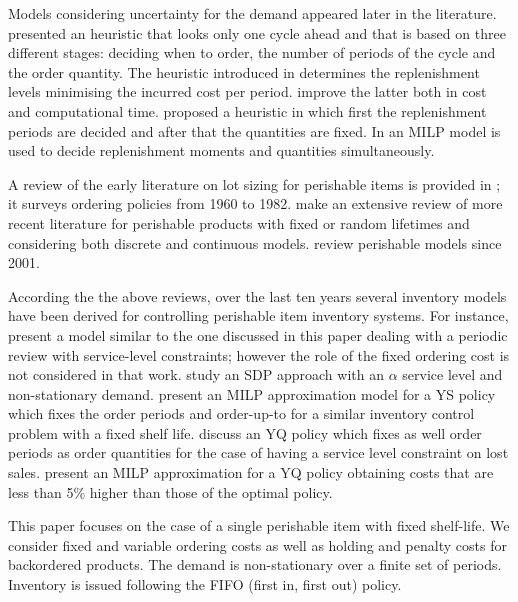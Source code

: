 \documentclass{tPRS2e}
\begin{document}
	Models considering uncertainty for the demand appeared later in the literature. \cite{citeulike:7292564} presented an heuristic that looks only one cycle ahead and that is based on three different stages: deciding when to order, the number of periods of the cycle and the order quantity. The heuristic introduced in \cite{Askin} determines the replenishment levels minimising the incurred cost per period. \cite{Bollapragada:1999} improve the latter both in cost and computational time.  \cite{BookbinderandTan} proposed a heuristic in which first the replenishment periods are decided and after that the quantities are fixed. In \cite{citeulike:12317242} an MILP model is used to decide replenishment moments and quantities simultaneously.


	
%	
	A review of the early literature on lot sizing for perishable items is provided in \cite{citeulike:11825042}; it surveys ordering policies  from 1960 to 1982. \cite{citeulike:11825044} make an extensive review of more recent literature for perishable products with fixed or random lifetimes and considering both discrete and continuous models. \cite{citeulike:10674763} review perishable models since 2001.
	

	According the the above reviews, over the last ten years several inventory models have been derived for controlling perishable item inventory systems. For instance, \cite{citeulike:6806835} present a model similar to  the one discussed in this paper dealing with a periodic review with service-level constraints; however the role of the fixed ordering cost is not considered in that work. \cite{citeulike:12534249} study an SDP approach with an $\alpha$ service level and non-stationary demand. \cite{citeulike:13666707} present an MILP approximation model for a YS policy which fixes the order periods and order-up-to for a similar inventory control problem with a fixed shelf life. \cite{GAlcoba:ICCSA2015} discuss an YQ policy which fixes as well order periods as order quantities for the case of having a service level constraint on lost sales. \cite{PaulsWorm2015} present an MILP approximation for a YQ policy obtaining costs that are less than 5\% higher than those of the optimal policy.
	
	This paper focuses on the case of a single perishable item with fixed shelf-life. We consider fixed and variable ordering costs as well as holding and penalty costs for backordered products. The demand is non-stationary over a finite set of periods. Inventory is issued following the FIFO (first in, first out) policy. 
	
\end{document}
